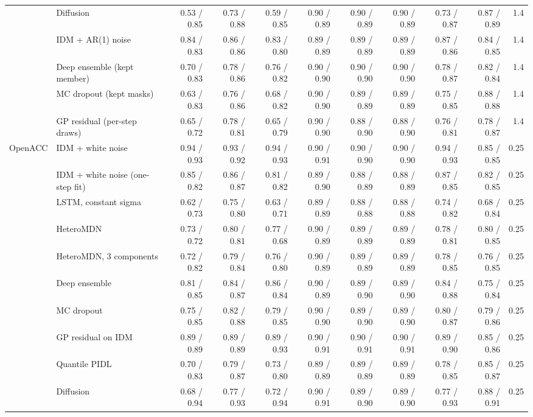 \begin{longtable}{llrrrrrrrrr}
 & Diffusion & 0.53 / 0.85 & 0.73 / 0.88 & 0.59 / 0.85 & 0.90 / 0.89 & 0.90 / 0.89 & 0.90 / 0.89 & 0.73 / 0.87 & 0.87 / 0.89 & 1.4 \\
 & IDM + AR(1) noise & 0.84 / 0.83 & 0.86 / 0.86 & 0.83 / 0.80 & 0.89 / 0.89 & 0.89 / 0.89 & 0.89 / 0.89 & 0.87 / 0.86 & 0.84 / 0.85 & 1.4 \\
 & Deep ensemble (kept member) & 0.70 / 0.83 & 0.78 / 0.86 & 0.76 / 0.82 & 0.90 / 0.90 & 0.90 / 0.90 & 0.90 / 0.90 & 0.78 / 0.87 & 0.82 / 0.84 & 1.4 \\
 & MC dropout (kept masks) & 0.63 / 0.83 & 0.76 / 0.86 & 0.68 / 0.82 & 0.90 / 0.90 & 0.89 / 0.89 & 0.89 / 0.89 & 0.75 / 0.85 & 0.88 / 0.88 & 1.4 \\
 & GP residual (per-step draws) & 0.65 / 0.72 & 0.78 / 0.81 & 0.65 / 0.79 & 0.90 / 0.90 & 0.88 / 0.90 & 0.88 / 0.90 & 0.76 / 0.81 & 0.78 / 0.87 & 1.4 \\
\midrule
OpenACC & IDM + white noise & 0.94 / 0.93 & 0.93 / 0.92 & 0.94 / 0.93 & 0.90 / 0.91 & 0.90 / 0.90 & 0.90 / 0.90 & 0.94 / 0.93 & 0.85 / 0.85 & 0.25 \\
 & IDM + white noise (one-step fit) & 0.85 / 0.82 & 0.86 / 0.87 & 0.81 / 0.82 & 0.89 / 0.90 & 0.88 / 0.89 & 0.88 / 0.89 & 0.87 / 0.85 & 0.82 / 0.85 & 0.25 \\
 & LSTM, constant sigma & 0.62 / 0.73 & 0.75 / 0.80 & 0.63 / 0.71 & 0.89 / 0.89 & 0.88 / 0.88 & 0.88 / 0.88 & 0.74 / 0.82 & 0.68 / 0.84 & 0.25 \\
 & HeteroMDN & 0.73 / 0.72 & 0.80 / 0.81 & 0.77 / 0.68 & 0.90 / 0.89 & 0.89 / 0.89 & 0.89 / 0.89 & 0.78 / 0.81 & 0.80 / 0.85 & 0.25 \\
 & HeteroMDN, 3 components & 0.72 / 0.82 & 0.79 / 0.84 & 0.76 / 0.80 & 0.90 / 0.89 & 0.89 / 0.89 & 0.89 / 0.89 & 0.78 / 0.85 & 0.76 / 0.85 & 0.25 \\
 & Deep ensemble & 0.81 / 0.85 & 0.84 / 0.87 & 0.86 / 0.84 & 0.90 / 0.89 & 0.89 / 0.90 & 0.89 / 0.90 & 0.84 / 0.88 & 0.75 / 0.84 & 0.25 \\
 & MC dropout & 0.75 / 0.85 & 0.82 / 0.88 & 0.79 / 0.85 & 0.90 / 0.90 & 0.89 / 0.90 & 0.89 / 0.90 & 0.80 / 0.87 & 0.79 / 0.86 & 0.25 \\
 & GP residual on IDM & 0.89 / 0.89 & 0.89 / 0.89 & 0.89 / 0.93 & 0.90 / 0.91 & 0.90 / 0.91 & 0.90 / 0.91 & 0.89 / 0.90 & 0.85 / 0.86 & 0.25 \\
 & Quantile PIDL & 0.70 / 0.83 & 0.79 / 0.87 & 0.73 / 0.80 & 0.89 / 0.89 & 0.89 / 0.89 & 0.89 / 0.89 & 0.78 / 0.85 & 0.85 / 0.87 & 0.25 \\
 & Diffusion & 0.68 / 0.94 & 0.77 / 0.93 & 0.72 / 0.94 & 0.90 / 0.91 & 0.89 / 0.90 & 0.89 / 0.90 & 0.77 / 0.93 & 0.88 / 0.91 & 0.25 \\

\end{longtable}
